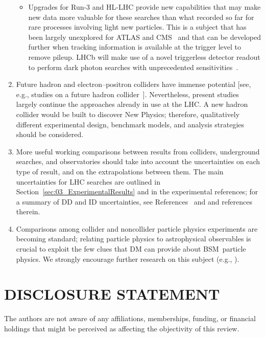 \documentclass{ar-1col}
\begin{document}
\begin{issues}
\begin{enumerate}
\begin{itemize}
\item Upgrades for Run-3 and HL-LHC provide new capabilities that may make
new data more valuable for these searches than what recorded so far
for rare processes involving light new particles. This is a subject that has been largely
unexplored for ATLAS and CMS~\cite{Alves:2016cqf} and that can be developed
further when tracking information is available at the trigger level to remove pileup.
LHCb will make use of a novel triggerless detector readout to
perform dark photon searches with unprecedented
sensitivities~\cite{Ilten:2016tkc}. 

\end{itemize}

\item Future hadron and electron--positron colliders have immense
potential [see, e.g., studies on a future hadron
collider~\cite{Golling:2016gvc}]. Nevertheless, present studies
largely continue the approaches already in use at the LHC. A new
hadron collider would be built to discover New Physics;
therefore, qualitatively different experimental design, benchmark
models, and analysis strategies should be considered.

\item More useful working comparisons between results from colliders,
underground searches, and observatories should take into account
the uncertainties on each type of result, and on the
extrapolations between them. The main uncertainties for LHC
searches are outlined in
Section~\ref{sec:03_ExperimentalResults} and in the experimental
references; for a summary of DD and ID uncertainties, see
References~ and  and
references therein.

\item Comparisons among collider and noncollider particle physics
experiments are becoming standard; relating particle physics to
astrophysical observables is crucial to exploit the few clues that
DM can provide about BSM\ particle physics. We
strongly encourage further research on this subject (e.g.,
).
\end{enumerate}
\end{issues}


\section*{DISCLOSURE STATEMENT}

The authors are not aware of any affiliations, memberships,
funding, or financial holdings that might be perceived as
affecting the objectivity of this review.
\end{document}
